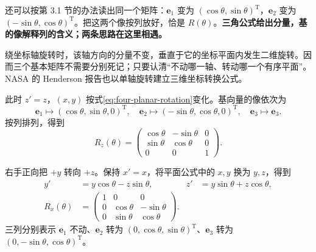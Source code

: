 \documentclass[a4paper,12pt,twoside,openany,fontset=none]{ctexbook}
\numberwithin{equation}{chapter}
\begin{document}
还可以按第 3.1 节的办法读出同一个矩阵：$\mathbf e_1$ 变为 $(\cos\theta,\sin\theta)^{\mathrm T}$，$\mathbf e_2$ 变为 $(-\sin\theta,\cos\theta)^{\mathrm T}$。把这两个像按列放好，恰是 $R(\theta)$。\textbf{三角公式给出分量，基的像解释列的含义；两条思路在这里相遇。}

绕坐标轴旋转时，该轴方向的分量不变，垂直于它的坐标平面内发生二维旋转。因而三个基本矩阵不需要分别死记；只要认清“不动哪一轴、转动哪一个有序平面”。NASA 的 Henderson 报告也以单轴旋转建立三维坐标转换公式。\cite{henderson-euler-1977}

此时 $z'=z$，$(x,y)$ 按式\eqref{eq:four-planar-rotation}变化。基向量的像依次为
\begin{equation}
 \mathbf e_1\mapsto(\cos\theta,\sin\theta,0)^{\mathrm T},\quad
 \mathbf e_2\mapsto(-\sin\theta,\cos\theta,0)^{\mathrm T},\quad
 \mathbf e_3\mapsto\mathbf e_3.
\end{equation}
按列排列，得到
\begin{equation}
 R_z(\theta)=\begin{pmatrix}\cos\theta&-\sin\theta&0\\\sin\theta&\cos\theta&0\\0&0&1\end{pmatrix}.
 \label{eq:four-rz-derived}
\end{equation}

右手正向把 $+y$ 转向 $+z$。保持 $x'=x$，将平面公式中的 $x,y$ 换为 $y,z$，得到
\begin{align}
 y'&=y\cos\theta-z\sin\theta,&z'&=y\sin\theta+z\cos\theta,\\
 R_x(\theta)&=\begin{pmatrix}1&0&0\\0&\cos\theta&-\sin\theta\\0&\sin\theta&\cos\theta\end{pmatrix}.
 \label{eq:four-rx-derived}
\end{align}
三列分别表示 $\mathbf e_1$ 不动、$\mathbf e_2$ 转为 $(0,\cos\theta,\sin\theta)^{\mathrm T}$、$\mathbf e_3$ 转为 $(0,-\sin\theta,\cos\theta)^{\mathrm T}$。
\end{document}
